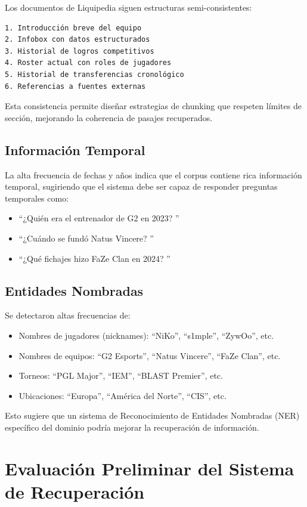 Los documentos de Liquipedia siguen estructuras semi-consistentes:
\begin{verbatim}
1. Introducción breve del equipo
2. Infobox con datos estructurados
3. Historial de logros competitivos
4. Roster actual con roles de jugadores
5. Historial de transferencias cronológico
6. Referencias a fuentes externas
\end{verbatim}

Esta consistencia permite diseñar estrategias de chunking que respeten límites de sección, mejorando la coherencia de pasajes recuperados.

\subsection{Información Temporal}

La alta frecuencia de fechas y años indica que el corpus contiene rica información temporal, sugiriendo que el sistema debe ser capaz de responder preguntas temporales como:
\begin{itemize}
    \item ``¿Quién era el entrenador de G2 en 2023? ''
    \item ``¿Cuándo se fundó Natus Vincere? ''
    \item ``¿Qué fichajes hizo FaZe Clan en 2024? ''
\end{itemize}

\subsection{Entidades Nombradas}

Se detectaron altas frecuencias de:
\begin{itemize}
    \item Nombres de jugadores (nicknames): ``NiKo'', ``s1mple'', ``ZywOo'', etc.
    \item Nombres de equipos: ``G2 Esports'', ``Natus Vincere'', ``FaZe Clan'', etc.
    \item Torneos: ``PGL Major'', ``IEM'', ``BLAST Premier'', etc.
    \item Ubicaciones: ``Europa'', ``América del Norte'', ``CIS'', etc.
\end{itemize}

Esto sugiere que un sistema de Reconocimiento de Entidades Nombradas (NER) específico del dominio podría mejorar la recuperación de información.

\section{Evaluación Preliminar del Sistema de Recuperación}


